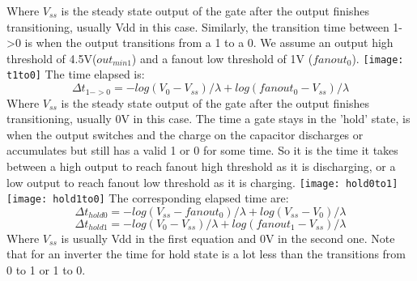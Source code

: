 \documentclass{article}
\begin{document}
Where $V_{ss}$ is the steady state output of the gate after the output finishes transitioning, usually Vdd in this case. \newline \newline
Similarly, the transition time between 1->0 is when the output transitions from a 1 to a 0.  We assume an output high threshold of 4.5V($out_{min1}$) and a fanout low threshold of 1V ($fanout_0$). \newline
\texttt{[image: t1to0]}
The time elapsed is:
\[\Delta t_{1->0}= -log(V_0-V_{ss})/ \lambda+ log(fanout_0-V_{ss})/ \lambda
\]
Where $V_{ss}$ is the steady state output of the gate after the output finishes transitioning, usually 0V in this case. \newline \newline
The time a gate stays in the 'hold' state, is when the output switches and the charge on the capacitor discharges or accumulates but still has a valid 1 or 0 for some time.  So it is the time it takes between a high output to reach fanout high threshold as it is discharging, or a low output to reach fanout low threshold as it is charging. \newline
\texttt{[image: hold0to1]}
\texttt{[image: hold1to0]}
The corresponding elapsed time are:
\[\Delta t_{hold 0}= -log(V_{ss}-fanout_0)/ \lambda+ log(V_{ss}-V_0)/ \lambda
\]
\[\Delta t_{hold 1}= -log(V_0-V_{ss})/ \lambda+ log(fanout_1-V_{ss})/ \lambda
\]
Where $V_{ss}$ is usually Vdd in the first equation and 0V in the second one. Note that for an inverter the time for hold state is a lot less than the transitions from 0 to 1 or 1 to 0.\newline \newline
\end{document}
